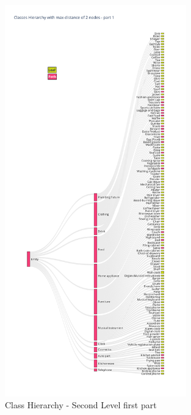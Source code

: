 \documentclass[11pt, a4paper, twocolumn]{article}
\begin{document}
\begin{appendices}
	\begin{figure}[!ht]
		\centering
		\includegraphics[width=0.7\textwidth]{lvl2_classes_pt1.png}
		\caption{\scriptsize Class Hierarchy - Second Level first part}
	\end{figure}
	\begin{figure}[!ht]
		\centering

\end{figure}
\end{appendices}
\end{document}
